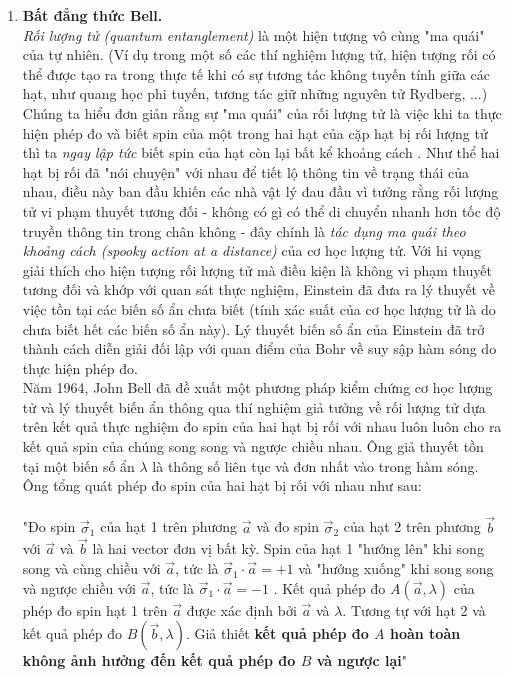 \begin{enumerate}
    \item \textbf{Bất đẳng thức Bell.} \\
    \textit{Rối lượng tử (quantum entanglement)} là một hiện tượng vô cùng "ma quái" của tự nhiên. (Ví dụ trong một số các thí nghiệm lượng tử, hiện tượng rối có thể được tạo ra trong thực tế khi có sự tương tác không tuyến tính giữa các hạt, như quang học phi tuyến, tương tác giữ những nguyên tử Rydberg, ...) Chúng ta hiểu đơn giản rằng sự "ma quái" của rối lượng tử là việc khi ta thực hiện phép đo và biết spin của một trong hai hạt của cặp hạt bị rối lượng tử thì ta \textit{ngay lập tức} biết spin của hạt còn lại bất kể khoảng cách . Như thể hai hạt bị rối đã "nói chuyện" với nhau để tiết lộ thông tin về trạng thái của nhau, điều này ban đầu khiến các nhà vật lý đau đầu vì tưởng rằng rối lượng tử vi phạm thuyết tương đối - không có gì có thể di chuyển nhanh hơn tốc độ truyền thông tin trong chân không - đây chính là \textit{tác dụng ma quái theo khoảng cách (spooky action at a distance)} của cơ học lượng tử. Với hi vọng giải thích cho hiện tượng rối lượng tử mà điều kiện là không vi phạm thuyết tương đối và khớp với quan sát thực nghiệm, Einstein đã đưa ra lý thuyết về việc tồn tại các biến số ẩn chưa biết (tính xác suất của cơ học lượng tử là do chưa biết hết các biến số ẩn này). Lý thuyết biến số ẩn của Einstein đã trở thành cách diễn giải đối lập với quan điểm của Bohr về suy sập hàm sóng do thực hiện phép đo.\\
Năm 1964, John Bell đã đề xuất một phương pháp kiểm chứng cơ học lượng tử và lý thuyết biến ẩn thông qua thí nghiệm giả tưởng về rối lượng tử dựa trên kết quả thực nghiệm đo spin của hai hạt bị rối với nhau luôn luôn cho ra kết quả spin của chúng song song và ngược chiều nhau. Ông giả thuyết tồn tại một biến số ẩn $\lambda$ là thông số liên tục và đơn nhất vào trong hàm sóng. Ông tổng quát phép đo spin của hai hạt bị rối với nhau như sau:\\ \\
"Đo spin $\Vec{\sigma}_1$ của hạt 1 trên phương $\Vec{a}$ và đo spin $\Vec{\sigma}_2$ của hạt 2 trên phương $\Vec{b}$ với $\Vec{a}$ và $\Vec{b}$ là hai vector đơn vị bất kỳ. Spin của hạt 1 "hướng lên" khi song song và cùng chiều với $\Vec{a}$, tức là $\Vec{\sigma}_1 \cdot \Vec{a}=+1$ và "hướng xuống" khi song song và ngược chiều với $\Vec{a}$, tức là $\Vec{\sigma}_1 \cdot \Vec{a}=-1$ . Kết quả phép đo $A(\Vec{a},\lambda)$ của phép đo spin hạt 1 trên $\Vec{a}$ được xác định bởi $\Vec{a}$ và $\lambda$. Tương tự với hạt 2 và kết quả phép đo $B(\Vec{b},\lambda)$. Giả thiết \textbf{kết quả phép đo $A$ hoàn toàn không ảnh hưởng đến kết quả phép đo $B$ và ngược lại}"\\ 


\end{enumerate}
